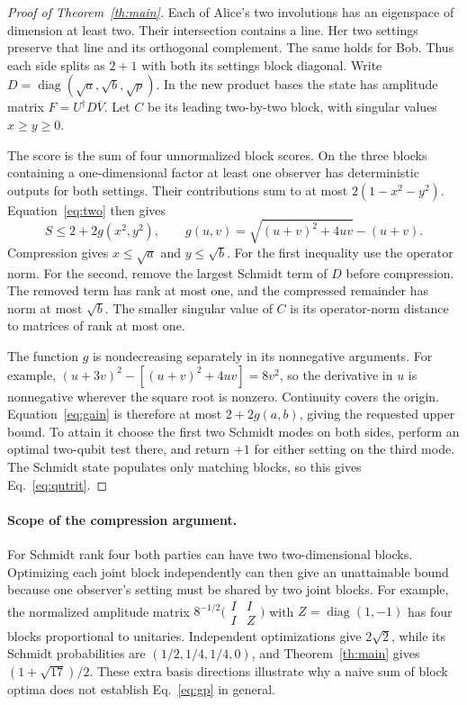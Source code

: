 \documentclass[11pt]{article}
\begin{document}
\begin{proof}[Proof of Theorem~\ref{th:main}]
Each of Alice's two involutions has an eigenspace of dimension at least two. Their intersection contains a line. Her two settings preserve that line and its orthogonal complement. The same holds for Bob. Thus each side splits as $2+1$ with both its settings block diagonal. Write $D=\operatorname{diag}(\sqrt a,\sqrt b,\sqrt p)$. In the new product bases the state has amplitude matrix $F=U^\dagger D\overline V$. Let $C$ be its leading two-by-two block, with singular values $x\ge y\ge0$.

The score is the sum of four unnormalized block scores. On the three blocks containing a one-dimensional factor at least one observer has deterministic outputs for both settings. Their contributions sum to at most $2(1-x^2-y^2)$. Equation~\eqref{eq:two} then gives
\begin{equation}
 S\le 2+2g(x^2,y^2),\qquad g(u,v)=\sqrt{(u+v)^2+4uv}-(u+v).
 \label{eq:gain}
\end{equation}
Compression gives $x\le\sqrt a$ and $y\le\sqrt b$. For the first inequality use the operator norm. For the second, remove the largest Schmidt term of $D$ before compression. The removed term has rank at most one, and the compressed remainder has norm at most $\sqrt b$. The smaller singular value of $C$ is its operator-norm distance to matrices of rank at most one.

The function $g$ is nondecreasing separately in its nonnegative arguments. For example, $(u+3v)^2-[(u+v)^2+4uv]=8v^2$, so the derivative in $u$ is nonnegative wherever the square root is nonzero. Continuity covers the origin. Equation~\eqref{eq:gain} is therefore at most $2+2g(a,b)$, giving the requested upper bound. To attain it choose the first two Schmidt modes on both sides, perform an optimal two-qubit test there, and return $+1$ for either setting on the third mode. The Schmidt state populates only matching blocks, so this gives Eq.~\eqref{eq:qutrit}.
\end{proof}

\paragraph{Scope of the compression argument.}
For Schmidt rank four both parties can have two two-dimensional blocks. Optimizing each joint block independently can then give an unattainable bound because one observer's setting must be shared by two joint blocks. For example, the normalized amplitude matrix $8^{-1/2}\bigl(\begin{smallmatrix} I&I\\I&Z\end{smallmatrix}\bigr)$ with $Z=\operatorname{diag}(1,-1)$ has four blocks proportional to unitaries. Independent optimizations give $2\sqrt2$, while its Schmidt probabilities are $(1/2,1/4,1/4,0)$, and Theorem~\ref{th:main} gives $(1+\sqrt{17})/2$. These extra basis directions illustrate why a naive sum of block optima does not establish Eq.~\eqref{eq:gp} in general.
\end{document}
